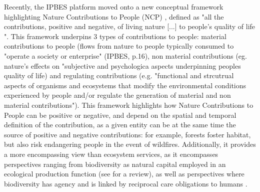 Recently, the IPBES platform moved onto a new conceptual framework highlighting Nature Contributions to People (NCP) \citep{DIAZ20151}, defined as "all the contributions, positive and negative, of living nature [...] to people's quality of life \citep{diaz_2018}". This framework underpins 3 types of contributions to people: material contributions to people (flows from nature to people typically consumed to "operate a society or enterprise" (IPBES, p.16), non material contributions (eg. nature's effects on "subjective and psychologica aspects underpinning peoples quality of life) and regulating contributions (e.g. "functional and strcutrual aspects of organisms and ecosystems that modify the environmental conditions experienced by people and/or regulate the generation of material and non material contributions"). This framework highlights how Nature Contributions to People can be positive or negative, and depend on the spatial and temporal definition of the contribution, as a given entity can be at the same time the source of positive and negative contributions: for example, forests foster habitat, but also risk endangering people in the event of wildfires. Additionally, it provides a more encompassing view than ecosystem services, as it encompasses perspectives ranging from biodiversity as natural capital employed in an ecological production function (see \cite{polasky_integrating_2009} for a review), as well as perspectives where biodiversity has agency and is linked by reciprocal care obligations to humans \citep{descola}. 


